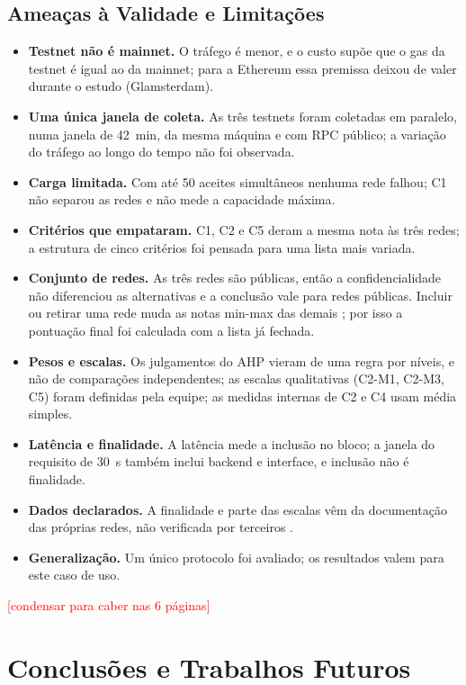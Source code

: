 \documentclass[10pt,a4paper]{article}
\newcommand{\pendente}[1]{\textcolor{red}{[#1]}}
\begin{document}
\subsection{Ameaças à Validade e Limitações}\label{sec:ameacas}

\begin{itemize}
\item \textbf{Testnet não é mainnet.} O tráfego é menor, e o custo supõe que o gas da testnet é igual ao da mainnet; para a Ethereum essa premissa deixou de valer durante o estudo (Glamsterdam).
\item \textbf{Uma única janela de coleta.} As três testnets foram coletadas em paralelo, numa janela de 42~min, da mesma máquina e com RPC público; a variação do tráfego ao longo do tempo não foi observada.
\item \textbf{Carga limitada.} Com até 50 aceites simultâneos nenhuma rede falhou; C1 não separou as redes e não mede a capacidade máxima.
\item \textbf{Critérios que empataram.} C1, C2 e C5 deram a mesma nota às três redes; a estrutura de cinco critérios foi pensada para uma lista mais variada.
\item \textbf{Conjunto de redes.} As três redes são públicas, então a confidencialidade não diferenciou as alternativas e a conclusão vale para redes públicas. Incluir ou retirar uma rede muda as notas min-max das demais \cite{belton1983}; por isso a pontuação final foi calculada com a lista já fechada.
\item \textbf{Pesos e escalas.} Os julgamentos do AHP vieram de uma regra por níveis, e não de comparações independentes; as escalas qualitativas (C2-M1, C2-M3, C5) foram definidas pela equipe; as medidas internas de C2 e C4 usam média simples.
\item \textbf{Latência e finalidade.} A latência mede a inclusão no bloco; a janela do requisito de 30~s também inclui backend e interface, e inclusão não é finalidade.
\item \textbf{Dados declarados.} A finalidade e parte das escalas vêm da documentação das próprias redes, não verificada por terceiros \cite{gramoli2023}.
\item \textbf{Generalização.} Um único protocolo foi avaliado; os resultados valem para este caso de uso.
\end{itemize}
\pendente{condensar para caber nas 6 páginas}

\section{Conclusões e Trabalhos Futuros}\label{sec:conclusao}
\end{document}
